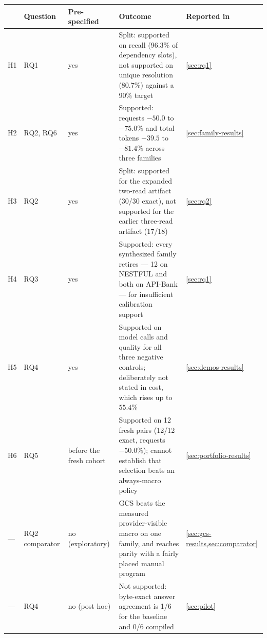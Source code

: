 \begin{tabularx}{\textwidth}{@{}l l l >{\raggedright\arraybackslash}X l@{}}
  \toprule
  & Question & Pre-specified & Outcome & Reported in \\
  \midrule
  H1 & RQ1 & yes &
    Split: supported on recall (96.3\% of dependency slots), not supported on unique
    resolution (80.7\%) against a 90\% target &
    \cref{sec:rq1} \\
  H2 & RQ2, RQ6 & yes &
    Supported: requests $-50.0$ to $-75.0\%$ and total tokens $-39.5$ to $-81.4\%$
    across three families &
    \cref{sec:family-results} \\
  H3 & RQ2 & yes &
    Split: supported for the expanded two-read artifact (30/30 exact), not supported
    for the earlier three-read artifact (17/18) &
    \cref{sec:rq2} \\
  H4 & RQ3 & yes &
    Supported: every synthesized family retires --- 12 on NESTFUL and both on API-Bank
    --- for insufficient calibration support &
    \cref{sec:rq1} \\
  H5 & RQ4 & yes &
    Supported on model calls and quality for all three negative controls; deliberately
    not stated in cost, which rises up to $55.4\%$ &
    \cref{sec:demos-results} \\
  H6 & RQ5 & before the fresh cohort &
    Supported on 12 fresh pairs (12/12 exact, requests $-50.0\%$); cannot establish that
    selection beats an always-macro policy &
    \cref{sec:portfolio-results} \\
  \addlinespace[3pt]
  --- & RQ2 comparator & no (exploratory) &
    GCS beats the measured provider-visible macro on one family, and reaches parity with
    a fairly placed manual program &
    \cref{sec:gcs-results,sec:comparator} \\
  --- & RQ4 & no (post hoc) &
    Not supported: byte-exact answer agreement is 1/6 for the baseline and 0/6 compiled &
    \cref{sec:pilot} \\
  \bottomrule
\end{tabularx}
